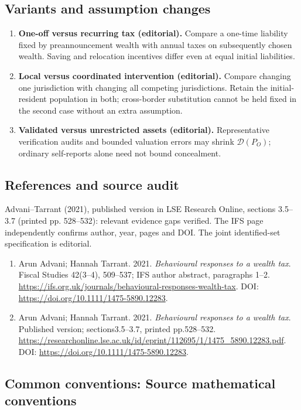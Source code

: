 \documentclass[11pt,a4paper]{article}
\begin{document}
\subsection*{Variants and assumption changes}
\begin{enumerate}
\item \textbf{One-off versus recurring tax (editorial).} Compare a one-time liability fixed by preannouncement wealth with annual taxes on subsequently chosen wealth. Saving and relocation incentives differ even at equal initial liabilities.
\item \textbf{Local versus coordinated intervention (editorial).} Compare changing one jurisdiction with changing all competing jurisdictions. Retain the initial-resident population in both; cross-border substitution cannot be held fixed in the second case without an extra assumption.
\item \textbf{Validated versus unrestricted assets (editorial).} Representative verification audits and bounded valuation errors may shrink \(\mathcal D(P_O)\); ordinary self-reports alone need not bound concealment.
\end{enumerate}
\subsection*{References and source audit}
Advani--Tarrant (2021), published version in LSE Research Online, sections 3.5--3.7 (printed pp. 528--532): relevant evidence gaps verified. The IFS page independently confirms author, year, pages and DOI. The joint identified-set specification is editorial.
\begin{enumerate}\raggedright
\item\hypertarget{definitions:source:30007754:1}{} Arun Advani; Hannah Tarrant. 2021. \emph{Behavioural responses to a wealth tax}. Fiscal Studies 42(3–4), 509–537; IFS author abstract, paragraphs 1–2.
\url{https://ifs.org.uk/journals/behavioural-responses-wealth-tax}.
DOI: \url{https://doi.org/10.1111/1475-5890.12283}.
\item\hypertarget{definitions:source:30007754:2}{} Arun Advani; Hannah Tarrant. 2021. \emph{Behavioural responses to a wealth tax}. Published version; sections3.5–3.7, printed pp.528–532.
\url{https://researchonline.lse.ac.uk/id/eprint/112695/1/1475_5890.12283.pdf}.
DOI: \url{https://doi.org/10.1111/1475-5890.12283}.
\end{enumerate}

\subsection*{Common conventions: Source mathematical conventions}
\end{document}
